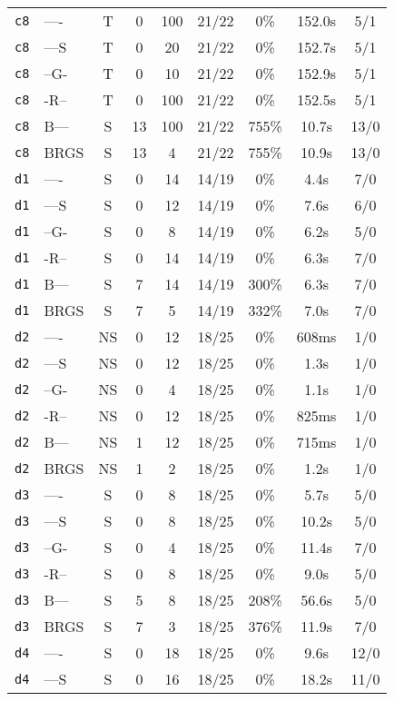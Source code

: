\begin{tabular}{llccccccc}
\texttt{c8} & ---- & T & 0 & 100 & 21/22 & 0\% & 152.0s & 5/1 \\
\texttt{c8} & ---S & T & 0 & 20 & 21/22 & 0\% & 152.7s & 5/1 \\
\texttt{c8} & --G- & T & 0 & 10 & 21/22 & 0\% & 152.9s & 5/1 \\
\texttt{c8} & -R-- & T & 0 & 100 & 21/22 & 0\% & 152.5s & 5/1 \\
\texttt{c8} & B--- & S & 13 & 100 & 21/22 & 755\% & 10.7s & 13/0 \\
\texttt{c8} & BRGS & S & 13 & 4 & 21/22 & 755\% & 10.9s & 13/0 \\
\texttt{d1} & ---- & S & 0 & 14 & 14/19 & 0\% & 4.4s & 7/0 \\
\texttt{d1} & ---S & S & 0 & 12 & 14/19 & 0\% & 7.6s & 6/0 \\
\texttt{d1} & --G- & S & 0 & 8 & 14/19 & 0\% & 6.2s & 5/0 \\
\texttt{d1} & -R-- & S & 0 & 14 & 14/19 & 0\% & 6.3s & 7/0 \\
\texttt{d1} & B--- & S & 7 & 14 & 14/19 & 300\% & 6.3s & 7/0 \\
\texttt{d1} & BRGS & S & 7 & 5 & 14/19 & 332\% & 7.0s & 7/0 \\
\texttt{d2} & ---- & NS & 0 & 12 & 18/25 & 0\% & 608ms & 1/0 \\
\texttt{d2} & ---S & NS & 0 & 12 & 18/25 & 0\% & 1.3s & 1/0 \\
\texttt{d2} & --G- & NS & 0 & 4 & 18/25 & 0\% & 1.1s & 1/0 \\
\texttt{d2} & -R-- & NS & 0 & 12 & 18/25 & 0\% & 825ms & 1/0 \\
\texttt{d2} & B--- & NS & 1 & 12 & 18/25 & 0\% & 715ms & 1/0 \\
\texttt{d2} & BRGS & NS & 1 & 2 & 18/25 & 0\% & 1.2s & 1/0 \\
\texttt{d3} & ---- & S & 0 & 8 & 18/25 & 0\% & 5.7s & 5/0 \\
\texttt{d3} & ---S & S & 0 & 8 & 18/25 & 0\% & 10.2s & 5/0 \\
\texttt{d3} & --G- & S & 0 & 4 & 18/25 & 0\% & 11.4s & 7/0 \\
\texttt{d3} & -R-- & S & 0 & 8 & 18/25 & 0\% & 9.0s & 5/0 \\
\texttt{d3} & B--- & S & 5 & 8 & 18/25 & 208\% & 56.6s & 5/0 \\
\texttt{d3} & BRGS & S & 7 & 3 & 18/25 & 376\% & 11.9s & 7/0 \\
\texttt{d4} & ---- & S & 0 & 18 & 18/25 & 0\% & 9.6s & 12/0 \\
\texttt{d4} & ---S & S & 0 & 16 & 18/25 & 0\% & 18.2s & 11/0 \\

\end{tabular}
